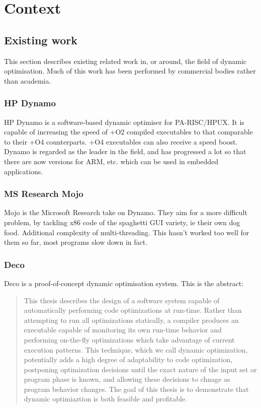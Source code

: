 \chapter{Context}

\section{Existing work}

This section describes existing related work in, or around, the field of dynamic optimisation. Much of this work has been performed by commercial bodies rather than academia.

\subsection{HP Dynamo}

HP Dynamo is a software-based dynamic optimiser for PA-RISC/HPUX. It is capable of increasing the speed of +O2 compiled executables to that comparable to their +O4 counterparts. +O4 executables can also receive a speed boost. Dynamo is regarded as the leader in the field, and has progressed a lot so that there are now versions for ARM, etc. which can be used in embedded applications.

\subsection{MS Research Mojo}

Mojo is the Microsoft Research take on Dynamo. They aim for a more difficult problem, by tackling x86 code of the spaghetti GUI variety, ie their own dog food. Additional complexity of multi-threading. This hasn't worked too well for them so far, most programs slow down in fact.

\subsection{Deco}

Deco is a proof-of-concept dynamic optimisation system. This is the abstract:

\begin{quote}
This thesis describes the design of a software system capable of automatically performing code optimizations at run-time. Rather than attempting to run all optimizations statically, a compiler produces an executable capable of monitoring its own run-time behavior and performing on-the-fly optimizations which take advantage of current execution patterns. This technique, which we call dynamic optimization, potentially adds a high degree of adaptability to code optimization, postponing optimization decisions until the exact nature of the input set or program phase is known, and allowing these decisions to chnage as program behavior changes. The goal of this thesis is to demonstrate that dynamic optimiaztion is both feasible and profitable.
\end{quote}

